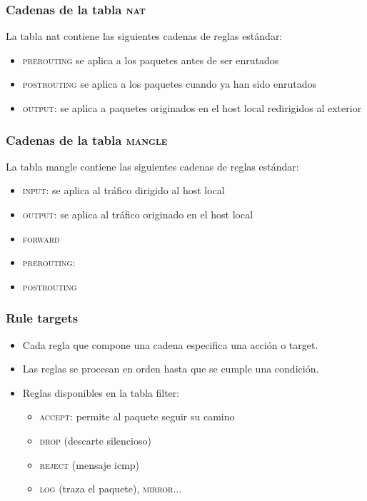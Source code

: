 \documentclass{beamer}
\begin{document}
\begin{frame}
\frametitle{Cadenas de la tabla \textsc{nat}}

La tabla \alert{nat} contiene las siguientes cadenas de reglas estándar: 
	\begin{itemize}
        \item \textsc{prerouting} se aplica a los paquetes antes de ser enrutados
        \item \textsc{postrouting} se aplica a los paquetes cuando ya han sido enrutados
	\item \textsc{output}: se aplica a paquetes originados en el host local redirigidos al exterior
	\end{itemize}

\end{frame}

\begin{frame}
\frametitle{Cadenas de la tabla \textsc{mangle}}

La tabla \alert{mangle} contiene las siguientes cadenas de reglas estándar: 
	\begin{itemize}
	\item \textsc{input}: se aplica al tráfico dirigido al host local
	\item \textsc{output}: se aplica al tráfico originado en el host local
        \item \textsc{forward}
        \item \textsc{prerouting}: 
        \item \textsc{postrouting}
	\end{itemize}

\end{frame}



\begin{frame}
\frametitle{Rule targets}

\begin{itemize}
\item Cada regla que compone una cadena especifica una acción o \alert{target}.
\item Las reglas se procesan en orden hasta que se cumple una condición.
\item Reglas disponibles en la tabla filter:
	\begin{itemize}
	\item \textsc{accept}: permite al paquete seguir su camino
	\item \textsc{drop} (descarte silencioso) 
	\item \textsc{reject} (mensaje icmp)
	\item \textsc{log} (traza el paquete), \textsc{mirror}...
	\end{itemize}
\end{itemize}

\end{frame}
\end{document}
